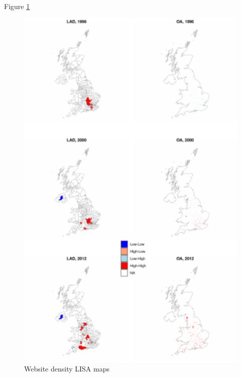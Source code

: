 \documentclass[
  authoryear,
  preprint,
  3p]{elsarticle}
\begin{document}
Figure \ref{lisa}

\begin{figure}[H]

{\centering \includegraphics[width=1\textwidth,height=0.8\textheight]{tranos2023_files/figure-pdf/unnamed-chunk-7-1.pdf}

}

\caption{\label{lisa}\centering Website density LISA maps}

\end{figure}%
\end{document}
